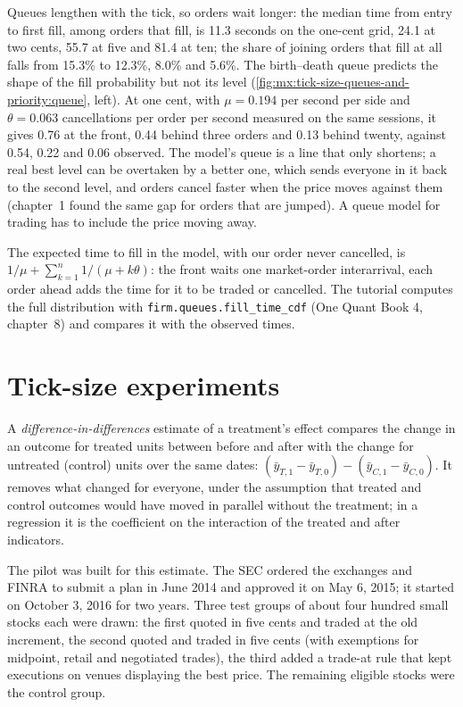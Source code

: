 Queues lengthen with the tick, so orders wait longer: the median time from entry to first fill, among orders that fill, is 11.3 seconds on the one-cent
grid, 24.1 at two cents, 55.7 at five and 81.4 at ten; the share of joining orders that fill at all falls from 15.3\% to 12.3\%, 8.0\% and 5.6\%. The
birth--death queue predicts the shape of the fill probability but not its level (\cref{fig:mx:tick-size-queues-and-priority:queue}, left). At one cent,
with $\mu=0.194$  per second per side and $\theta=0.063$ cancellations per order per second measured on the same sessions, it gives 0.76
at the front, 0.44 behind three orders and 0.13 behind twenty, against 0.54, 0.22 and 0.06 observed. The model's queue is a line that only shortens; a
real best level can be overtaken by a better one, which sends everyone in it back to the second level, and orders cancel faster when the price moves
against them (chapter~1 found the same gap for orders that are jumped). A queue model for trading has to include the price moving away.

The expected time to fill in the model, with our order never cancelled, is $1/\mu+\sum_{k=1}^n 1/(\mu+k\theta)$: the front waits one market-order
interarrival, each order ahead adds the time for it to be traded or cancelled. The tutorial computes the full distribution with
\texttt{firm.queues.fill\_time\_cdf} (One Quant Book 4, chapter~8) and compares it with the observed times.

\section{Tick-size experiments}

\begin{definition}\label{def:mx:tick-size-queues-and-priority:did}
A \emph{difference-in-differences} estimate of a treatment's effect compares the change in an outcome for treated
units between before and after with the change for untreated (control) units over the same dates: $(\bar y_{T,1}-\bar y_{T,0})-(\bar y_{C,1}-\bar
y_{C,0})$. It removes what changed for everyone, under the assumption that treated and control outcomes would have moved in parallel without the
treatment; in a regression it is the coefficient on the interaction of the treated and after indicators.
\end{definition}

The pilot was built for this estimate. The SEC ordered the exchanges and FINRA to submit a plan in June 2014 and approved it on May 6, 2015; it started
on October 3, 2016 for two years. Three test groups of about four hundred small stocks each were drawn: the first quoted in five cents and traded at the
old increment, the second quoted and traded in five cents (with exemptions for midpoint, retail and negotiated trades), the third added a trade-at rule
that kept executions on venues displaying the best price. The remaining eligible stocks were the control group.

